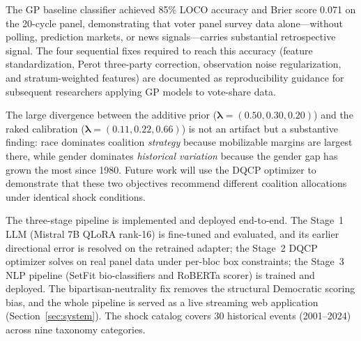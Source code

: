 \documentclass[12pt, letterpaper]{article}
\theoremstyle{definition}
\begin{document}
The GP baseline classifier achieved 85\% LOCO accuracy and Brier score 0.071
on the 20-cycle panel, demonstrating that voter panel survey data alone---without
polling, prediction markets, or news signals---carries substantial retrospective
signal. The four sequential fixes required to reach this accuracy (feature
standardization, Perot three-party correction, observation noise regularization,
and stratum-weighted features) are documented as reproducibility guidance for
subsequent researchers applying GP models to vote-share data.

The large divergence between the additive prior ($\boldsymbol{\lambda} =
(0.50, 0.30, 0.20)$) and the raked calibration
($\boldsymbol{\lambda} = (0.11, 0.22, 0.66)$) is not an artifact but a
substantive finding: race dominates coalition \textit{strategy} because mobilizable
margins are largest there, while gender dominates \textit{historical variation}
because the gender gap has grown the most since 1980. Future work will use the
DQCP optimizer to demonstrate that these two objectives recommend different
coalition allocations under identical shock conditions.

The three-stage pipeline is implemented and deployed end-to-end. The Stage~1 LLM
(Mistral 7B QLoRA rank-16) is fine-tuned and evaluated, and its earlier directional
error is resolved on the retrained adapter; the Stage~2 DQCP optimizer solves on real
panel data under per-bloc box constraints; the Stage~3 NLP pipeline (SetFit
bio-classifiers and RoBERTa scorer) is trained and deployed. The bipartisan-neutrality
fix removes the structural Democratic scoring bias, and the whole pipeline is served as
a live streaming web application (Section~\ref{sec:system}). The shock catalog covers
30 historical events (2001--2024) across nine taxonomy categories.
\end{document}
